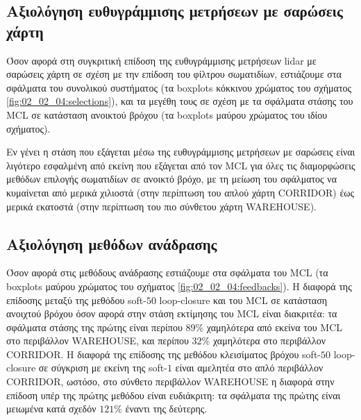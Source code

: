 \subsection{Αξιολόγηση ευθυγράμμισης μετρήσεων με σαρώσεις χάρτη}

Όσον αφορά στη συγκριτική επίδοση της ευθυγράμμισης μετρήσεων lidar με σαρώσεις
χάρτη σε σχέση με την επίδοση του φίλτρου σωματιδίων, εστιάζουμε στα σφάλματα
του συνολικού συστήματος (τα boxplots κόκκινου χρώματος του σχήματος
\ref{fig:02_02_04:selections}), και τα μεγέθη τους σε σχέση με τα σφάλματα
στάσης του MCL σε κατάσταση ανοικτού βρόχου (τα boxplots μαύρου χρώματος του
ιδίου σχήματος).

Εν γένει η στάση που εξάγεται μέσω της ευθυγράμμισης μετρήσεων με σαρώσεις
είναι λιγότερο εσφαλμένη από εκείνη που εξάγεται από τον MCL για όλες τις
διαμορφώσεις μεθόδων επιλογής σωματιδίων σε ανοικτό βρόχο, με τη μείωση του
σφάλματος να κυμαίνεται από μερικά χιλιοστά (στην περίπτωση του απλού χάρτη
CORRIDOR) έως μερικά εκατοστά (στην περίπτωση του πιο σύνθετου χάρτη
WAREHOUSE).

\subsection{Αξιολόγηση μεθόδων ανάδρασης}

Όσον αφορά στις μεθόδους ανάδρασης εστιάζουμε στα σφάλματα του MCL (τα
boxplots μαύρου χρώματος του σχήματος \ref{fig:02_02_04:feedbacks}). Η διαφορά
της επίδοσης μεταξύ της μεθόδου soft-$50$ loop-closure και του MCL σε κατάσταση
ανοιχτού βρόχου όσον αφορά στην στάση εκτίμησης του MCL είναι διακριτέα: τα
σφάλματα στάσης της πρώτης είναι περίπου $89\%$ χαμηλότερα από εκείνα του MCL
στο περιβάλλον WAREHOUSE, και περίπου $32\%$ χαμηλότερα στο περιβάλλον
CORRIDOR. Η διαφορά της επίδοσης της μεθόδου κλεισίματος βρόχου soft-$50$
loop-closure σε σύγκριση με εκείνη της soft-$1$ είναι αμελητέα στο απλό
περιβάλλον CORRIDOR, ωστόσο, στο σύνθετο περιβάλλον WAREHOUSE η διαφορά στην
επίδοση υπέρ της πρώτης μεθόδου είναι ευδιάκριτη: τα σφάλματα της πρώτης είναι
μειωμένα κατά σχεδόν $121\%$ έναντι της δεύτερης.

